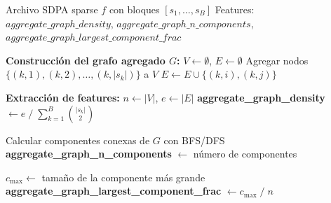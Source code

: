 \begin{algorithm}[H]
\caption{Construcción del grafo agregado y extracción de sus features}
\label{alg:features_aggregate_graph}
\begin{algorithmic}[1]
\Require Archivo SDPA sparse $f$ con bloques $[s_1,\dots,s_B]$
\Ensure  Features: $aggregate\_graph\_density$,
         $aggregate\_graph\_n\_components$,
         $aggregate\_graph\_largest\_component\_frac$

\Statex \textbf{Construcción del grafo agregado $G$:}
\State $V \gets \emptyset$, $E \gets \emptyset$
    \State Agregar nodos $\{(k,1), (k,2), \dots, (k,|s_k|)\}$ a $V$
        \State $E \gets E \cup \{(k,i),(k,j)\}$
    \EndFor
\EndFor

\Statex \textbf{Extracción de features:}
\State $n \gets |V|$, \quad $e \gets |E|$
\State \textbf{aggregate\_graph\_density}
       $\gets e \;/\; \sum_{k=1}^{B} \binom{|s_k|}{2}$

\State Calcular componentes conexas de $G$ con BFS/DFS
\State \textbf{aggregate\_graph\_n\_components}
       $\gets$ número de componentes

\State $c_{\max} \gets$ tamaño de la componente más grande
\State \textbf{aggregate\_graph\_largest\_component\_frac}
       $\gets c_{\max} \;/\; n$
\end{algorithmic}
\end{algorithm}
